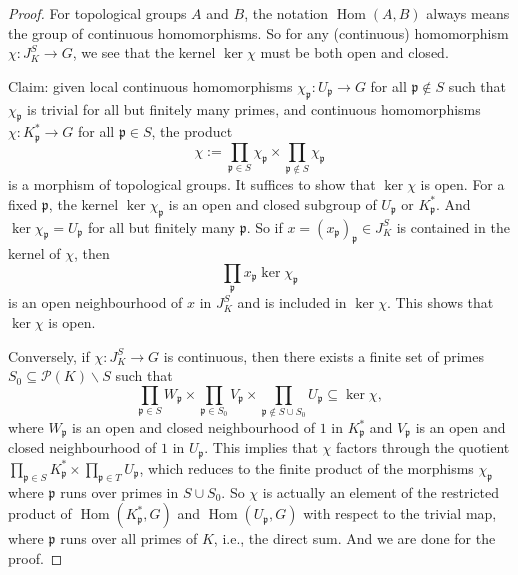 \documentclass{amsart}
\numberwithin{equation}{section}
\theoremstyle{plain}
\theoremstyle{definition}
\theoremstyle{remark}
\begin{document}
\begin{proof}
	For topological groups $A$ and $B$, the notation $\operatorname{Hom}(A,B)$ always means the group of continuous homomorphisms.
	So for any (continuous) homomorphism $\chi:J_K^S\to G$, we see that the kernel $\ker\chi$ must be both open and closed.
	
	Claim: given local continuous homomorphisms $\chi_{\mathfrak{p}}:U_{\mathfrak{p}}\to G$ for all $\mathfrak{p}\notin S$ such that $\chi_{\mathfrak{p}}$ is trivial for all but finitely many primes, and continuous homomorphisms $\chi:K_{\mathfrak{p}}^*\to G$ for all $\mathfrak{p}\in S$, the product
	\begin{equation*}
		\chi:=\prod_{\mathfrak{p}\in S}\chi_{\mathfrak{p}}\times\prod_{\mathfrak{p}\notin S}\chi_{\mathfrak{p}}
	\end{equation*}
	is a morphism of topological groups.
	It suffices to show that $\ker\chi$ is open.
	For a fixed $\mathfrak{p}$, the kernel $\ker\chi_{\mathfrak{p}}$ is an open and closed subgroup of $U_{\mathfrak{p}}$ or $K_{\mathfrak{p}}^*$.
	And $\ker\chi_{\mathfrak{p}}=U_{\mathfrak{p}}$ for all but finitely many $\mathfrak{p}$.
	So if $x=(x_{\mathfrak{p}})_{\mathfrak{p}}\in J_K^S$ is contained in the kernel of $\chi$, then
	\begin{equation*}
		\prod_{\mathfrak{p}}x_{\mathfrak{p}}\ker\chi_{\mathfrak{p}}
	\end{equation*}
	is an open neighbourhood of $x$ in $J_K^S$ and is included in $\ker\chi$.
	This shows that $\ker\chi$ is open.
	
	Conversely, if $\chi:J_K^S\to G$ is continuous, then there exists a finite set of primes $S_0\subseteq\mathcal{P}(K)\backslash S$ such that
	\begin{equation*}
		\prod_{\mathfrak{p}\in S}W_{\mathfrak{p}}\times\prod_{\mathfrak{p}\in S_0}V_{\mathfrak{p}}\times\prod_{\mathfrak{p}\notin S\cup S_0}U_{\mathfrak{p}}\subseteq\ker\chi,
	\end{equation*}
	where $W_{\mathfrak{p}}$ is an open and closed neighbourhood of $1$ in $K_{\mathfrak{p}}^*$ and $V_{\mathfrak{p}}$ is an open and closed neighbourhood of $1$ in $U_{\mathfrak{p}}$.
	This implies that $\chi$ factors through the quotient $\prod_{\mathfrak{p}\in S}K_{\mathfrak{p}}^*\times\prod_{\mathfrak{p}\in T}U_{\mathfrak{p}}$, which reduces to the finite product of the morphisms $\chi_{\mathfrak{p}}$ where $\mathfrak{p}$ runs over primes in $S\cup S_0$.
	So $\chi$ is actually an element of the restricted product of $\operatorname{Hom}(K_{\mathfrak{p}}^*,G)$ and $\operatorname{Hom}(U_{\mathfrak{p}},G)$ with respect to the trivial map, where $\mathfrak{p}$ runs over all primes of $K$,
	i.e., the direct sum.
	And we are done for the proof.
\end{proof}
\end{document}

